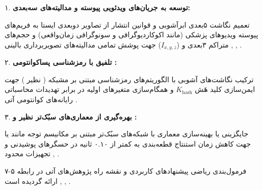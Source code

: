 
۱. \textbf{توسعه به جریان‌های ویدئویی پیوسته و مدالیته‌های سه‌بعدی:}\par

تعمیم نگاشت ۵بعدی ابرآشوبی و قوانین انتشار  از تصاویر دوبعدی ایستا به فریم‌های پیوسته ویدیوهای پزشکی (مانند اکوکاردیوگرافی و سونوگرافی زمان‌واقعی) و حجم‌های متراکم ۳بعدی  و  ($I_{x,\allowbreak{}y,\allowbreak{}z}$) جهت پوشش تمامی مدالیته‌های تصویربرداری بالینی , , .\par



۲. \textbf{تلفیق با رمزشناسی پساکوانتومی :}\par

ترکیب نگاشت‌های آشوبی با الگوریتم‌های رمزشناسی مبتنی بر مشبکه‌ ( نظیر ) جهت ایمن‌سازی کلید هَش $K_{\mathrm{hash}}$ و همگام‌سازی متغیرهای اولیه در برابر تهدیدات محاسباتی رایانه‌های کوانتومی آتی .\par



۳. \textbf{بهره‌گیری از معماری‌های سبُک‌تر نظیر   و :}\par

جایگزینی یا بهینه‌سازی معماری  با شبکه‌های سبُک‌تر مبتنی بر مکانیسم توجه  مانند  یا  جهت کاهش زمان استنتاج قطعه‌بندی  به کمتر از ۰.۱۰ ثانیه در حسگرهای پوشیدنی و تجهیزات محدود  , .\par



فرمول‌بندی ریاضی پیشنهادهای کاربردی و نقشه راه پژوهش‌های آتی در رابطه ۵{-}۷ ارائه گردیده است , , .\par

